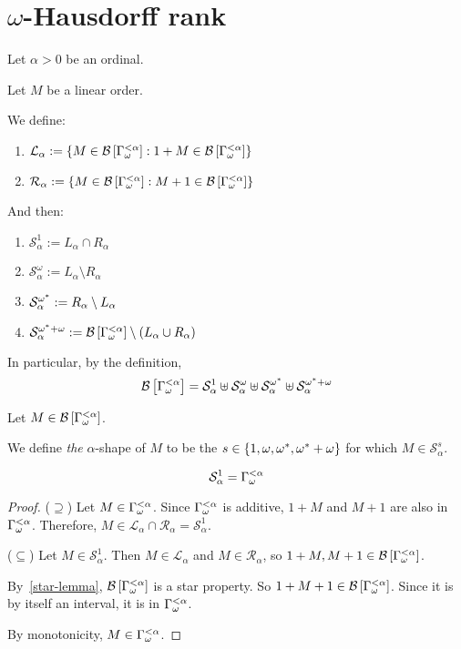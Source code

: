 \section{\texorpdfstring{$\omega$}{omega}-Hausdorff rank}

\begin{definitions}
  Let $\alpha > 0$ be an ordinal.

  Let $M$ be a linear order.

  We define:
  \begin{enumerate}
    \item $\mathcal{L}_{\alpha} := \left\{ {M \in \mathcal{B} \left[ {{\Gamma_{\omega}^{< \alpha}}} \right] : 1 + M \in \mathcal{B} \left[ {{\Gamma_{\omega}^{< \alpha}}} \right]} \right\}$
    \item $\mathcal{R}_{\alpha} := \left\{ {M \in \mathcal{B} \left[ {{\Gamma_{\omega}^{< \alpha}}} \right] : M + 1 \in \mathcal{B} \left[ {{\Gamma_{\omega}^{< \alpha}}} \right]} \right\}$
  \end{enumerate}

  And then:
  \begin{enumerate}
    \item $\mathcal{S}^{1}_{\alpha} := L_{\alpha} \cap R_{\alpha}$
    \item $\mathcal{S}^{\omega}_{\alpha} := L_{\alpha} \setminus R_{\alpha}$
    \item $\mathcal{S}^{\omega^\ast}_{\alpha} := R_{\alpha} \setminus L_{\alpha}$
    \item $\mathcal{S}^{\omega^\ast + \omega}_{\alpha} := \mathcal{B} \left[ {{\Gamma_{\omega}^{< \alpha}}} \right] \setminus (L_{\alpha} \cup R_{\alpha})$
  \end{enumerate}

  In particular, by the definition,
  \[
    \mathcal{B} \left[ {{\Gamma_{\omega}^{< \alpha}}} \right]
    = \mathcal{S}^{1}_{\alpha}
    \uplus \mathcal{S}^{\omega}_{\alpha}
    \uplus \mathcal{S}^{\omega^\ast}_{\alpha}
    \uplus \mathcal{S}^{\omega^\ast + \omega}_{\alpha}
  \]

  Let $M \in \mathcal{B} \left[ {{\Gamma_{\omega}^{< \alpha}}} \right]$.

  We define \emph{the} $\alpha$-shape
  of $M$ to be the $s \in \left\{ {1, \omega, \omega^\ast, \omega^\ast + \omega} \right\}$
  for which $M \in \mathcal{S}^{s}_{\alpha}$.
\end{definitions}

\begin{lemma}\label{b_alpha-structure-lemma-1}
  \[
    \mathcal{S}^{1}_{\alpha} = \Gamma_{\omega}^{< \alpha}
  \]
\end{lemma}

\begin{proof}
  ($\supseteq$) Let $M \in \Gamma_{\omega}^{< \alpha}$.
  Since $\Gamma_{\omega}^{< \alpha}$ is additive, $1 + M$ and $M + 1$ are also in $\Gamma_{\omega}^{< \alpha}$.
  Therefore, $M \in \mathcal{L}_{\alpha} \cap \mathcal{R}_{\alpha}
    = \mathcal{S}^{1}_{\alpha}$.

  ($\subseteq$) Let $M \in \mathcal{S}^{1}_{\alpha}$.
  Then $M \in \mathcal{L}_{\alpha}$ and $M \in \mathcal{R}_{\alpha}$,
  so $1 + M, M + 1 \in \mathcal{B} \left[ {{\Gamma_{\omega}^{< \alpha}}} \right]$.

  By~\cref{star-lemma}, $\mathcal{B} \left[ {{\Gamma_{\omega}^{< \alpha}}} \right]$ is a star property.
  So $1 + M + 1 \in \mathcal{B} \left[ {{\Gamma_{\omega}^{< \alpha}}} \right]$. Since it is by itself
  an interval, it is in $\Gamma_{\omega}^{< \alpha}$.

  By monotonicity, $M \in \Gamma_{\omega}^{< \alpha}$.
\end{proof}

